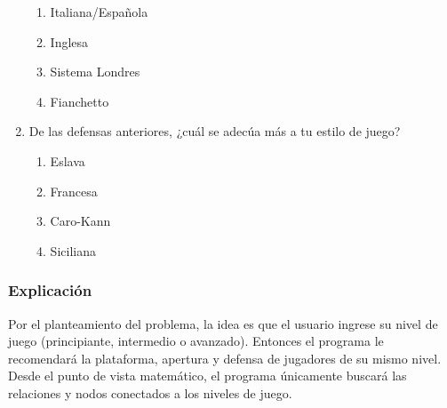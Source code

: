 \begin{enumerate}
    \begin{enumerate}
        \item Italiana/Española
        \item Inglesa
        \item Sistema Londres
        \item Fianchetto
    \end{enumerate}
    \item De las defensas anteriores, ¿cuál se adecúa más a tu estilo de juego? 
    \begin{enumerate}
        \item Eslava
        \item Francesa
        \item Caro-Kann
        \item Siciliana
    \end{enumerate}
\end{enumerate}
\subsubsection{Explicación}

Por el planteamiento del problema, la idea es que el usuario ingrese su nivel de juego (principiante, intermedio o avanzado). Entonces el programa le recomendará la plataforma, apertura y defensa de jugadores de su mismo nivel. Desde el punto de vista matemático, el programa únicamente buscará las relaciones y nodos conectados a los niveles de juego. \newline

